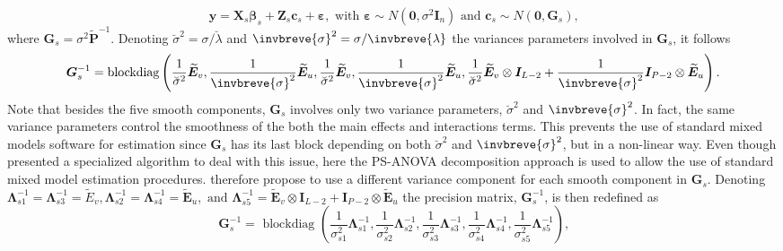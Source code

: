 \begin{equation}
    \boldsymbol{y}=\boldsymbol{X}_{s} \boldsymbol{\beta}_{s}+\boldsymbol{Z}_{s} \boldsymbol{c}_{s}+\boldsymbol{\varepsilon}, \text { with } \boldsymbol{\varepsilon} \sim N\left(\mathbf{0}, \sigma^{2} \boldsymbol{I}_{n}\right) \text { and } \boldsymbol{c}_{s} \sim N\left(\mathbf{0}, \boldsymbol{G}_{s}\right)
    \text{,}
\end{equation}
where $\boldsymbol{G}_{s} = \sigma^2\widetilde{\boldsymbol{P}}^{-1}$. Denoting $\breve{\sigma}^2 =\sigma / \breve{\lambda}$ and $\invbreve{\sigma}^2 =\sigma / \invbreve{\lambda}$ the variances parameters involved in $\boldsymbol{G}_{s}$, it follows
\begin{equation}
    \boldsymbol{G}_s^{-1} = \text{blockdiag}\left(\frac{1}{\breve{\sigma}^{2}} \widetilde{\boldsymbol{E}}_{v}, \frac{1}{\invbreve{\sigma}^{2}} \widetilde{\boldsymbol{E}}_{u}, \frac{1}{\breve{\sigma}^{2}} \widetilde{\boldsymbol{E}}_{v}, \frac{1}{\invbreve{\sigma}^{2}} \widetilde{\boldsymbol{E}}_{u}, \frac{1}{\breve{\sigma}^{2}} \widetilde{\boldsymbol{E}}_{v} \otimes \boldsymbol{I}_{L-2}+\frac{1}{\invbreve{\sigma}^{2}} \boldsymbol{I}_{P-2} \otimes \widetilde{\boldsymbol{E}}_{u}\right)
    \text{.}
\end{equation}
Note that besides the five smooth components, $\mathbf{G}_s$ involves only two variance parameters, $\breve{\sigma}^2$ and $\invbreve{\sigma}^2$. In fact, the same variance parameters control the smoothness of the both the main effects and interactions terms. This prevents the use of standard mixed models software for estimation since $\mathbf{G}_s$ has its last block depending on both $\breve{\sigma}^2$ and $\invbreve{\sigma}^2$, but in a non-linear way. Even though \textcite{rodriguez2015fast} presented a specialized algorithm to deal with this issue, here the PS-ANOVA decomposition approach \parencite{lee_efficient_2013} is used to allow the use of standard mixed model estimation procedures. \textcite{lee_efficient_2013} therefore propose to use a different variance component for each smooth component in $\mathbf{G}_s$. Denoting 
$\mathbf{\Lambda}_{s 1}^{-1}=\mathbf{\Lambda}_{s 3}^{-1}=\widetilde{E}_{v}, \mathbf{\Lambda}_{s 2}^{-1}=\mathbf{\Lambda}_{s 4}^{-1}=\widetilde{\boldsymbol{E}}_{u}, \text { and } \mathbf{\Lambda}_{s 5}^{-1}=\widetilde{\boldsymbol{E}}_{v} \otimes \boldsymbol{I}_{L-2}+\boldsymbol{I}_{P-2} \otimes \widetilde{\boldsymbol{E}}_{u}$
the precision matrix, $\boldsymbol{G}_s^{-1}$, is then redefined as
\begin{equation}
    \mathbf{G}_{s}^{-1}=\text { blockdiag }\left(\frac{1}{\sigma_{s 1}^{2}} \mathbf{\Lambda}_{s 1}^{-1}, \frac{1}{\sigma_{s 2}^{2}} \mathbf{\Lambda}_{s 2}^{-1}, \frac{1}{\sigma_{s 3}^{2}} \mathbf{\Lambda}_{s 3}^{-1}, \frac{1}{\sigma_{s 4}^{2}} \mathbf{\Lambda}_{s 4}^{-1}, \frac{1}{\sigma_{s 5}^{2}} \mathbf{\Lambda}_{s 5}^{-1}\right)
    \text{,}
\end{equation}
